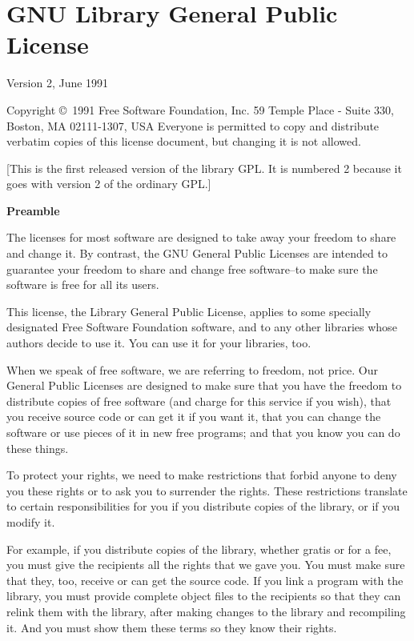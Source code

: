 
\section{GNU Library General Public License}

\begin{multicols}{3}\tiny\sf%

\begin{center}
  Version 2, June 1991 
\end{center}

Copyright \copyright\ 1991 Free Software Foundation, Inc.
59 Temple Place - Suite 330, Boston, MA  02111-1307, USA
Everyone is permitted to copy and distribute verbatim copies
of this license document, but changing it is not allowed.

[This is the first released version of the library GPL.  It is
 numbered 2 because it goes with version 2 of the ordinary GPL.]

\begin{center}
\bf Preamble
\end{center}

The licenses for most software are designed to take away your freedom to
share and change it. By contrast, the GNU General Public Licenses are
intended to guarantee your freedom to share and change free software--to
make sure the software is free for all its users.

This license, the Library General Public License, applies to some specially
designated Free Software Foundation software, and to any other libraries
whose authors decide to use it. You can use it for your libraries, too.

When we speak of free software, we are referring to freedom, not price. Our
General Public Licenses are designed to make sure that you have the freedom
to distribute copies of free software (and charge for this service if you
wish), that you receive source code or can get it if you want it, that you
can change the software or use pieces of it in new free programs; and that
you know you can do these things.

To protect your rights, we need to make restrictions that forbid anyone to
deny you these rights or to ask you to surrender the rights. These
restrictions translate to certain responsibilities for you if you
distribute copies of the library, or if you modify it.

For example, if you distribute copies of the library, whether gratis or for
a fee, you must give the recipients all the rights that we gave you. You
must make sure that they, too, receive or can get the source code. If you
link a program with the library, you must provide complete object files to
the recipients so that they can relink them with the library, after making
changes to the library and recompiling it. And you must show them these
terms so they know their rights.


\end{multicols}
